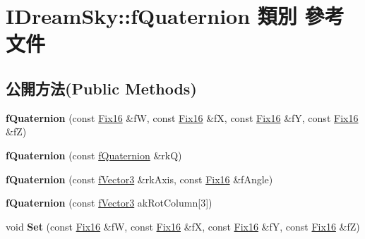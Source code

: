 \hypertarget{class_i_dream_sky_1_1f_quaternion}{}\section{I\+Dream\+Sky\+:\+:f\+Quaternion 類別 參考文件}
\label{class_i_dream_sky_1_1f_quaternion}
\subsection*{公開方法(Public Methods)}
\begin{DoxyCompactItemize}
\item 
{\bfseries f\+Quaternion} (const \hyperlink{class_i_dream_sky_1_1_fix_point}{Fix16} \&fW, const \hyperlink{class_i_dream_sky_1_1_fix_point}{Fix16} \&fX, const \hyperlink{class_i_dream_sky_1_1_fix_point}{Fix16} \&fY, const \hyperlink{class_i_dream_sky_1_1_fix_point}{Fix16} \&fZ)\hypertarget{class_i_dream_sky_1_1f_quaternion_a7cdec9b6126c70ecb5c91d45fbf51ab3}{}\label{class_i_dream_sky_1_1f_quaternion_a7cdec9b6126c70ecb5c91d45fbf51ab3}

\item 
{\bfseries f\+Quaternion} (const \hyperlink{class_i_dream_sky_1_1f_quaternion}{f\+Quaternion} \&rkQ)\hypertarget{class_i_dream_sky_1_1f_quaternion_aacc172355894b69d88597737978a93da}{}\label{class_i_dream_sky_1_1f_quaternion_aacc172355894b69d88597737978a93da}

\item 
{\bfseries f\+Quaternion} (const \hyperlink{class_i_dream_sky_1_1f_vector3}{f\+Vector3} \&rk\+Axis, const \hyperlink{class_i_dream_sky_1_1_fix_point}{Fix16} \&f\+Angle)\hypertarget{class_i_dream_sky_1_1f_quaternion_a210821e4d58efa7cf1239518264479d7}{}\label{class_i_dream_sky_1_1f_quaternion_a210821e4d58efa7cf1239518264479d7}

\item 
{\bfseries f\+Quaternion} (const \hyperlink{class_i_dream_sky_1_1f_vector3}{f\+Vector3} ak\+Rot\+Column\mbox{[}3\mbox{]})\hypertarget{class_i_dream_sky_1_1f_quaternion_ae1ceab2e636279f24c8f18081d118d46}{}\label{class_i_dream_sky_1_1f_quaternion_ae1ceab2e636279f24c8f18081d118d46}

\item 
void {\bfseries Set} (const \hyperlink{class_i_dream_sky_1_1_fix_point}{Fix16} \&fW, const \hyperlink{class_i_dream_sky_1_1_fix_point}{Fix16} \&fX, const \hyperlink{class_i_dream_sky_1_1_fix_point}{Fix16} \&fY, const \hyperlink{class_i_dream_sky_1_1_fix_point}{Fix16} \&fZ)\hypertarget{class_i_dream_sky_1_1f_quaternion_a51f8740feafbaf0c69eff0601f4cfe81}{}\label{class_i_dream_sky_1_1f_quaternion_a51f8740feafbaf0c69eff0601f4cfe81}


\end{DoxyCompactItemize}
